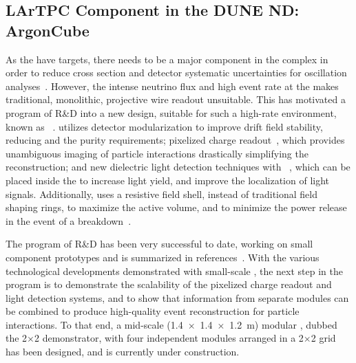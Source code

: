 \subsection{LArTPC Component in the DUNE ND: ArgonCube}
\label{sec:appx-nd:lartpc}


As the   have  targets, there needs to be a major  component in the    complex in order to reduce cross section and detector systematic uncertainties for oscillation analyses~\cite{Acciarri:2016crz, Acciarri:2015uup}. However, the intense neutrino flux and high event rate at the   makes traditional, monolithic, projective wire readout  unsuitable.  This has motivated a program of R\&D into a new  design, suitable for such a high-rate environment, known as ~\cite{argoncube_loi}.  utilizes detector modularization to improve drift field stability, reducing  and the  purity requirements; pixelized charge readout~\cite{Asaadi:2018oxk, larpix}, which provides unambiguous \threed imaging of particle interactions drastically simplifying the reconstruction; and new dielectric light detection techniques with ~\cite{Auger:2017flc}, which can be placed inside the  to increase light yield, and improve the localization of light signals. Additionally,  uses a resistive field shell, instead of traditional field shaping rings, to maximize the active volume, and to minimize the power release in the event of a breakdown~\cite{bib:docdb10419}. %

The program of  R\&D has been very successful to date, working on small component prototypes and is summarized in references~\cite{ Ereditato:2013xaa, Zeller:2013sva, art_cold_ero, Asaadi:2018oxk, Cavanna:2014iqa, larpix, argoncube_fd, Auger:2017flc}. 
With the various technological developments demonstrated with small-scale , the next step in the  program is to demonstrate the scalability of the pixelized charge readout and light detection systems, and to show that information from separate modules can be combined to produce high-quality event reconstruction for particle interactions. To that end, a mid-scale (\SI[product-units=repeat]{1.4x1.4x1.2}{\metre}) modular , dubbed the  2$\times$2 demonstrator, with four independent  modules arranged in a 2$\times$2 grid has been designed, and is currently under construction. 

